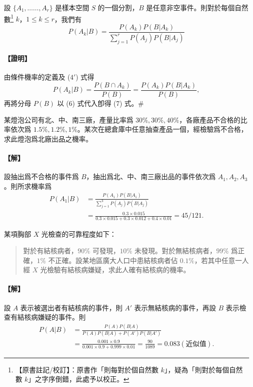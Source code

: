 \medskip
\begin{theorem}[貝氏定理]\label{thm:b5-4-5}
設 $\{A_1, \dots\dots, A_r\}$ 是樣本空間 $S$ 的一個分割，$B$ 是任意非空事件。則對於每個自然數\label{note:b5-ch4-bayes-typo}\footnote{【原書註記/校訂】：原書作「則每對於個自然數 $k$」，疑為「則對於每個自然數 $k$」之字序倒錯，此處予以校正。} $k$，$1 \le k \le r$，我們有
\begin{equation}\tag{7}\label{eq:b5-4-7}
P(A_k|B) = \frac{P(A_k) P(B|A_k)}{\sum_{j=1}^r P(A_j) P(B|A_j)}
\end{equation}
\end{theorem}
\paragraph{【證明】}
由條件機率的定義及 ($4'$) 式得
\[
P(A_k|B) = \frac{P(B \cap A_k)}{P(B)} = \frac{P(A_k) P(B|A_k)}{P(B)},
\]
再將分母 $P(B)$ 以 (6) 式代入卽得 (7) 式。\hfill\#

\medskip
\begin{example}\label{ex:b5-4-11}
某燈泡公司有北、中、南三廠，產量比率爲 $30\%, 30\%, 40\%$，各廠產品不合格的比率依次爲 $1.5\%, 1.2\%, 1\%$。某次在總倉庫中任意抽查產品一個，經檢驗爲不合格，求此燈泡爲北廠出品之機率。
\end{example}
\paragraph{【解】}
設抽出爲不合格的事件爲 $B$，抽出爲北、中、南三廠出品的事件依次爲 $A_1, A_2, A_3$。則所求機率爲
\begin{align*}
P(A_1|B) &= \frac{P(A_1) P(B|A_1)}{\sum_{j=1}^3 P(A_j) P(B|A_j)} \\
&= \frac{0.3 \times 0.015}{0.3 \times 0.015 + 0.3 \times 0.012 + 0.4 \times 0.01} = 45/121. \tag*{\#}
\end{align*}

\medskip
\begin{example}\label{ex:b5-4-12}
某項胸部 $X$ 光檢查的可靠程度如下：
\begin{quote}
對於有結核病者，$90\%$ 可發現，$10\%$ 未發現。對於無結核病者，$99\%$ 爲正確，$1\%$ 不正確。設某地區廣大人口中患結核病者佔 $0.1\%$，若其中任意一人經 $X$ 光檢驗有結核病嫌疑，求此人確有結核病的機率。
\end{quote}
\end{example}
\paragraph{【解】}
設 $A$ 表示被選出者有結核病的事件，則 $A'$ 表示無結核病的事件，再設 $B$ 表示檢查有結核病嫌疑的事件。則
\begin{align*}
P(A|B) &= \frac{P(A) P(B|A)}{P(A) P(B|A) + P(A') P(B|A')} \\
&= \frac{0.001 \times 0.9}{0.001 \times 0.9 + 0.999 \times 0.01} = \frac{90}{1089} = 0.083(\text{近似值}). \tag*{\#}
\end{align*}
